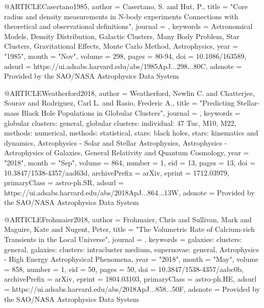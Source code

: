 \documentclass[twocolumn,tighten]{aastex63}
\begin{document}
@ARTICLE{Casertano1985,
       author = {{Casertano}, S. and {Hut}, P.},
        title = "{Core radius and density measurements in N-body experiments Connections with theoretical and observational definitions}",
      journal = {\apj},
     keywords = {Astronomical Models, Density Distribution, Galactic Clusters, Many Body Problem, Star Clusters, Gravitational Effects, Monte Carlo Method, Astrophysics},
         year = "1985",
        month = "Nov",
       volume = {298},
        pages = {80-94},
          doi = {10.1086/163589},
       adsurl = {https://ui.adsabs.harvard.edu/abs/1985ApJ...298...80C},
      adsnote = {Provided by the SAO/NASA Astrophysics Data System}
}

@ARTICLE{Weatherford2018,
       author = {{Weatherford}, Newlin C. and {Chatterjee}, Sourav and
         {Rodriguez}, Carl L. and {Rasio}, Frederic A.},
        title = "{Predicting Stellar-mass Black Hole Populations in Globular Clusters}",
      journal = {\apj},
     keywords = {globular clusters: general, globular clusters: individual: 47 Tuc, M10, M22, methods: numerical, methods: statistical, stars: black holes, stars: kinematics and dynamics, Astrophysics - Solar and Stellar Astrophysics, Astrophysics - Astrophysics of Galaxies, General Relativity and Quantum Cosmology},
         year = "2018",
        month = "Sep",
       volume = {864},
       number = {1},
          eid = {13},
        pages = {13},
          doi = {10.3847/1538-4357/aad63d},
archivePrefix = {arXiv},
       eprint = {1712.03979},
 primaryClass = {astro-ph.SR},
       adsurl = {https://ui.adsabs.harvard.edu/abs/2018ApJ...864...13W},
      adsnote = {Provided by the SAO/NASA Astrophysics Data System}
}

@ARTICLE{Frohmaier2018,
       author = {{Frohmaier}, Chris and {Sullivan}, Mark and {Maguire}, Kate and
         {Nugent}, Peter},
        title = "{The Volumetric Rate of Calcium-rich Transients in the Local Universe}",
      journal = {\apj},
     keywords = {galaxies: clusters: general, galaxies: clusters: intracluster medium, supernovae: general, Astrophysics - High Energy Astrophysical Phenomena},
         year = "2018",
        month = "May",
       volume = {858},
       number = {1},
          eid = {50},
        pages = {50},
          doi = {10.3847/1538-4357/aabc0b},
archivePrefix = {arXiv},
       eprint = {1804.03103},
 primaryClass = {astro-ph.HE},
       adsurl = {https://ui.adsabs.harvard.edu/abs/2018ApJ...858...50F},
      adsnote = {Provided by the SAO/NASA Astrophysics Data System}
}
\end{document}
